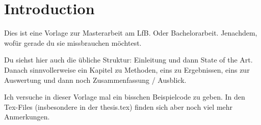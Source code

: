 \chapter{Introduction}

Dies ist eine Vorlage zur Masterarbeit am LfB. Oder Bachelorarbeit. Jenachdem, wofür gerade du sie missbrauchen möchtest.

Du siehst hier auch die übliche Struktur: Einleitung und dann State of the Art. Danach sinnvollerweise ein Kapitel zu Methoden, eins zu Ergebnissen, eins zur Auswertung und dann noch Zusammenfassung / Ausblick. 

Ich versuche in dieser Vorlage mal ein bisschen Beispielcode zu geben. In den Tex-Files (insbesondere in der thesis.tex) finden sich aber noch viel mehr Anmerkungen.